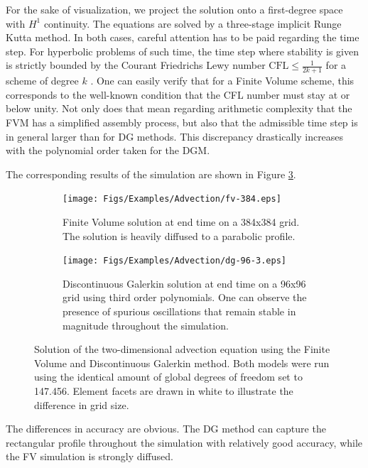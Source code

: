 \documentclass[asi,article,submit,moreauthors]{Definitions/mdpi}
\begin{document}
For the sake of visualization, we project the solution onto a first-degree space with $H^1$ continuity.
The equations are solved by a three-stage implicit Runge Kutta method.
In both cases, careful attention has to be paid regarding the time step.
For hyperbolic problems of such time, the time step where stability is given is strictly bounded by the Courant Friedrichs Lewy number $\text{CFL} \leq \frac{1}{2k+1}$ for a scheme of degree $k$ \cite{cockburnRungeKuttaDiscontinuous2001}.
One can easily verify that for a Finite Volume scheme, this corresponds to the well-known condition that the CFL number must stay at or below unity.
Not only does that mean regarding arithmetic complexity that the FVM has a simplified assembly process, but also that the admissible time step is in general larger than for DG methods.
This discrepancy drastically increases with the polynomial order taken for the DGM.

The corresponding results of the simulation are shown in Figure \ref{fig:advection-solutions}.

\begin{figure}[htbp!]
    \centering
    \begin{subfigure}[t]{0.49\textwidth}
        \centering
        \texttt{[image: Figs/Examples/Advection/fv-384.eps]}
        \caption{Finite Volume solution at end time on a 384x384 grid. The solution is heavily diffused to a parabolic profile.}
        \label{fig:advection-fvm}
    \end{subfigure}
    \hfill
    \begin{subfigure}[t]{0.49\textwidth}
        \centering
        \texttt{[image: Figs/Examples/Advection/dg-96-3.eps]}
        \caption{Discontinuous Galerkin solution at end time on a 96x96 grid using third order polynomials. One can observe the presence of spurious oscillations that remain stable in magnitude throughout the simulation.}
        \label{fig:advection-dgm}
    \end{subfigure}
   \caption{Solution of the two-dimensional advection equation using the Finite Volume and Discontinuous Galerkin method. Both models were run using the identical amount of global degrees of freedom set to 147.456. Element facets are drawn in white to illustrate the difference in grid size.}
   \label{fig:advection-solutions}
\end{figure}

The differences in accuracy are obvious.
The DG method can capture the rectangular profile throughout the simulation with relatively good accuracy, while the FV simulation is strongly diffused.
\end{document}
